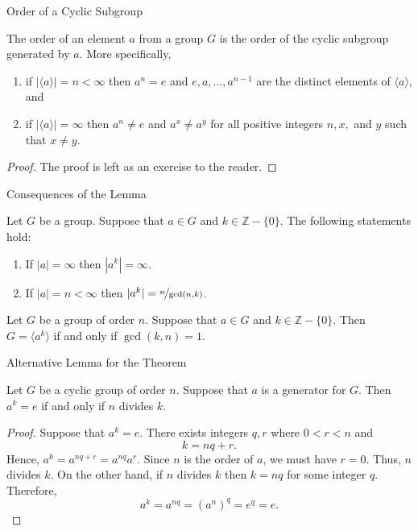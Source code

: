 \documentclass{beamer}
\begin{document}
\begin{frame}{Order of a Cyclic Subgroup}
\begin{lemma}
\justifying
The order of an element $a$ from a group $G$ is the order of the cyclic subgroup generated by $a$. More specifically,
\begin{enumerate}
\justifying
\item if $|\langle a\rangle| = n < \infty$ then $a^n = e$ and $e, a, \dots, a^{n - 1}$ are the distinct elements of $\langle a\rangle$, and
\item if $|\langle a\rangle| = \infty$ then $a^n \neq e$ and $a^x \neq a^y$ for all positive integers $n, x,$ and $y$ such that $x \neq y$.
\end{enumerate}
\end{lemma}
\pause
\begin{proof}
The proof is left as an exercise to the reader.    
\end{proof}
\end{frame}

\begin{frame}{Consequences of the Lemma}
\begin{theorem}
\justifying
Let $G$ be a group. Suppose that $a \in G$ and $k \in \mathbb{Z} - \{0\}$. The following statements hold:
\begin{enumerate}
\justifying
\item If $|a| = \infty$ then $|a^{k}| = \infty$.
\item If $|a| = n < \infty$ then $|a^k| = \nicefrac{n}{\gcd(n, k)}$. 
\end{enumerate}
\end{theorem}  
\begin{corollary}
\justifying
Let $G$ be a group of order $n$. Suppose that $a \in G$ and $k \in \mathbb{Z} - \{0\}$. Then $G = \langle a^k\rangle$ if and only if $\gcd(k, n) = 1$.
\end{corollary}
\end{frame}

\begin{frame}{Alternative Lemma for the Theorem}
\begin{lemma}
Let $G$ be a cyclic group of order $n$. Suppose that $a$ is a generator for $G$. Then $a^k = e$ if and only if $n$ divides $k$.
\end{lemma}
\pause
\begin{proof}
Suppose that $a^k = e$. There exists integers $q, r$ where $0 < r < n$ and
\[
k = nq + r.
\]
Hence, $a^k = a^{nq + r} = a^{nq}a^r$. Since $n$ is the order of $a$, we must have $r = 0$. Thus, $n$ divides $k$. 
On the other hand, if $n$ divides $k$ then $k = nq$ for some integer $q$. Therefore,
\[
a^k = a^{nq} = \left(a^n\right)^q = e^q = e.
\]
\end{proof}
\end{frame}
\end{document}
